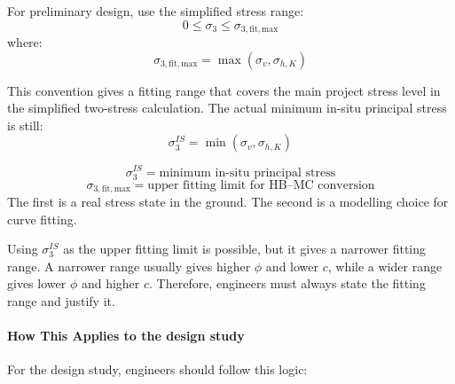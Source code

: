 \begin{notebox}
For preliminary design, use the simplified stress range:
\[
0 \leq \sigma_3 \leq \sigma_{3,\mathrm{fit,max}}
\]
where:
\[
\sigma_{3,\mathrm{fit,max}}=\max(\sigma_v,\sigma_{h,K})
\]

This convention gives a fitting range that covers the main project stress level in the
simplified two-stress calculation. The actual minimum in-situ principal stress is still:
\[
\sigma_3^{IS}=\min(\sigma_v,\sigma_{h,K})
\]
\end{notebox}

\begin{keybox}
\[
\sigma_3^{IS}=\text{minimum in-situ principal stress}
\]
\[
\sigma_{3,\mathrm{fit,max}}=\text{upper fitting limit for HB--MC conversion}
\]
The first is a real stress state in the ground. The second is a modelling choice for
curve fitting.
\end{keybox}

\begin{warnbox}
Using \(\sigma_3^{IS}\) as the upper fitting limit is possible, but it gives a narrower
fitting range. A narrower range usually gives higher \(\phi\) and lower \(c\), while a
wider range gives lower \(\phi\) and higher \(c\). Therefore, engineers must always state
the fitting range and justify it.
\end{warnbox}

\paragraph{How This Applies to the design study}

For the design study, engineers should follow this logic:

